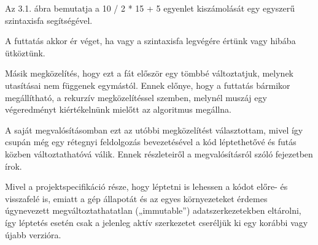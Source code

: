 Az 3.1. ábra bemutatja a 10 / 2 * 15 + 5 egyenlet kiszámolását egy egyszerű szintaxisfa segítségével.



A futtatás akkor ér véget, ha vagy a szintaxisfa legvégére értünk vagy hibába ütköztünk. 

Másik megközelítés, hogy ezt a fát először egy tömbbé változtatjuk, melynek utasításai nem függenek egymástól. Ennek előnye, hogy a futtatás bármikor megállítható, a rekurzív megközelítéssel szemben, melynél muszáj egy végeredményt kiértékelnünk mielőtt az algoritmus megállna. 

A saját megvalósításomban ezt az utóbbi megközelítést választottam, mivel így csupán még egy rétegnyi feldolgozás bevezetésével a kód léptethetővé és futás közben változtathatóvá válik. Ennek részleteiről a megvalósításról szóló fejezetben írok.

Mivel a projektspecifikáció része, hogy léptetni is lehessen a kódot előre- és visszafelé is, emiatt a gép állapotát és az egyes környezeteket érdemes úgynevezett megváltoztathatatlan („immutable”) adatszerkezetekben eltárolni, így léptetés esetén csak a jelenleg aktív szerkezetet cseréljük ki egy korábbi vagy újabb verzióra.
